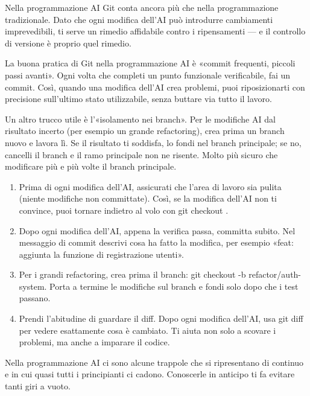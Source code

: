 
Nella programmazione AI Git conta ancora più che nella programmazione tradizionale. Dato che ogni modifica dell'AI può introdurre cambiamenti imprevedibili, ti serve un rimedio affidabile contro i ripensamenti — e il controllo di versione è proprio quel rimedio.

La buona pratica di Git nella programmazione AI è «commit frequenti, piccoli passi avanti». Ogni volta che completi un punto funzionale verificabile, fai un commit. Così, quando una modifica dell'AI crea problemi, puoi riposizionarti con precisione sull'ultimo stato utilizzabile, senza buttare via tutto il lavoro.

Un altro trucco utile è l'«isolamento nei branch». Per le modifiche AI dal risultato incerto (per esempio un grande refactoring), crea prima un branch nuovo e lavora lì. Se il risultato ti soddisfa, lo fondi nel branch principale; se no, cancelli il branch e il ramo principale non ne risente. Molto più sicuro che modificare più e più volte il branch principale.

\begin{enumerate}
  \item Prima di ogni modifica dell'AI, assicurati che l'area di lavoro sia pulita (niente modifiche non committate). Così, se la modifica dell'AI non ti convince, puoi tornare indietro al volo con git checkout .
  \item Dopo ogni modifica dell'AI, appena la verifica passa, committa subito. Nel messaggio di commit descrivi cosa ha fatto la modifica, per esempio «feat: aggiunta la funzione di registrazione utenti».
  \item Per i grandi refactoring, crea prima il branch: git checkout -b refactor/auth-system. Porta a termine le modifiche sul branch e fondi solo dopo che i test passano.
  \item Prendi l'abitudine di guardare il diff. Dopo ogni modifica dell'AI, usa git diff per vedere esattamente cosa è cambiato. Ti aiuta non solo a scovare i problemi, ma anche a imparare il codice.
\end{enumerate}


Nella programmazione AI ci sono alcune trappole che si ripresentano di continuo e in cui quasi tutti i principianti ci cadono. Conoscerle in anticipo ti fa evitare tanti giri a vuoto.

